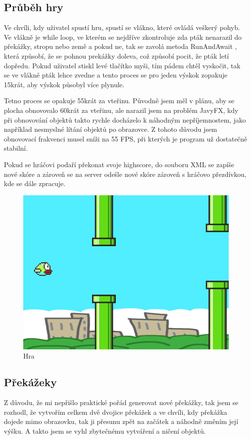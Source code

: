 \subsection{Průběh hry}
Ve chvíli, kdy uživatel spustí hru, spustí se vlákno, které ovládá veškerý pohyb. Ve vlákně je while loop, ve kterém se nejdříve zkontroluje zda pták nenarazil do překážky, stropu nebo země a pokud ne, tak se zavolá metoda RunAndAwait \cite{runAndAwait}, která způsobí, že se pohnou prekážky doleva, což způsobí pocit, že pták letí dopředu. Pokud uživatel stiskl levé tlačítko myši, tím pádem chtěl vyskočit, tak se ve vlákně pták lehce zvedne a tento proces se pro jeden výskok zopakuje 15krát, aby výskok působyl více plynule. 

Tetno proces se opakuje 55krát za vteřinu. Původně jsem měl v plánu, aby se plocha obnovovalo 60krát za vteřinu, ale narazil jsem na problém JavyFX, kdy při obnovování objektů takto rychle docházelo k náhodným nepříjemnostem, jako například nesmyslné lítání objektů po obrazovce. Z tohoto důvodu jsem obnovovací frakvenci musel sníži na 55 FPS, při kterých je program už dostatečně stabilní.

Pokud se hráčovi podaří překonat svoje highscore, do souboru XML se zapíše nové skóre a zároveň se na server odešle nové skóre zároveň s hráčovo přezdívkou, kde se dále zpracuje. 

\begin{figure}[ht!]
    \centering
    \includegraphics[scale=0.3]{images/game.png}
    \caption{Hra}
\end{figure}

\subsection{Překážeky}
Z důvodu, že mi nepřišlo praktické pořád generovat nové překážky, tak jsem se rozhodl, že vytvořím celkem dvě dvojice překážek a ve chvíli, kdy překážka dojede mimo obrazovku, tak ji přesunu zpět na začátek a náhodně změním její výšku. A takto jsem se vyhl zbytečnému vytváření a ničení objektů. 

